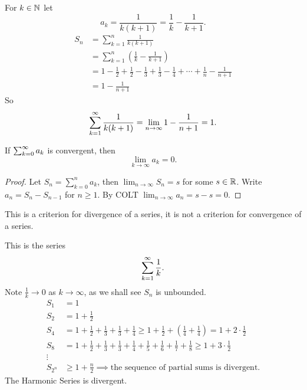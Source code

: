 \documentclass[10pt, a4paper]{article}
\begin{document}
\begin{example}
    For $k \in \N$ let
    \[
    a_k = \frac{1}{k(k + 1)} = \frac{1}{k} - \frac{1}{k + 1}.
    \]
    \begin{align*}
        S_n &= \sum_{k = 1}^{n}\frac{1}{k(k + 1)} \\
        &= \sum_{k = 1}^{n}\left(\frac{1}{k} - \frac{1}{k + 1}\right) \\
        &= 1 - \frac{1}{2} + \frac{1}{2} - \frac{1}{3} + \frac{1}{3} - \frac{1}{4} + \dotsi + \frac{1}{n} - \frac{1}{n + 1} \\
        &= 1 - \frac{1}{n + 1}
    \end{align*}
    So
    \[
    \infsum\frac{1}{k(k + 1)} = \lim_{n \rightarrow \infty}1 - \frac{1}{n + 1} = 1.
    \]
\end{example}

\begin{lemma}
    If $\infsum[k = 0]a_k$ is convergent,
    then
    \[
    \lim_{k \rightarrow \infty}a_k = 0.
    \]
    \begin{proof}
        Let $S_n = \sum_{k = 0}^{n}a_k$,
        then $\lim_{n \rightarrow \infty}S_n = s$ for some $s \in \R$.
        Write $a_n = S_n - S_{n - 1}$ for $n \geq 1$.
        By COLT $\lim_{n \rightarrow \infty}a_n = s - s = 0$.
    \end{proof}
\end{lemma}
This is a criterion for divergence of a series,
it is not a criterion for convergence of a series.

\begin{example}
    This is the series
    \[
    \infsum\frac{1}{k}.
    \]
    Note $\frac{1}{k} \rightarrow 0$ as $k \rightarrow \infty$,
    as we shall see $S_n$ is unbounded.
    \begin{align*}
    S_1 &= 1 \\
    S_2 &= 1 + \frac{1}{2} \\
    S_4 &= 1 + \frac{1}{2} + \frac{1}{3} + \frac{1}{3} + \frac{1}{4} \geq 1 + \frac{1}{2} + \left(\frac{1}{4} + \frac{1}{4}\right) = 1 + 2 \cdot \frac{1}{2} \\
    S_8 &= 1 + \frac{1}{2} + \frac{1}{3} + \frac{1}{3} + \frac{1}{4} + \frac{1}{5} + \frac{1}{6} + \frac{1}{7} + \frac{1}{8} \geq 1 + 3 \cdot \frac{1}{2} \\
    \vdots \\
    S_{2 ^ n} &\geq 1 + \frac{n}{2} \implies \text{the sequence of partial sums is divergent}.
    \end{align*}
    The Harmonic Series is divergent.
\end{example}
\end{document}
